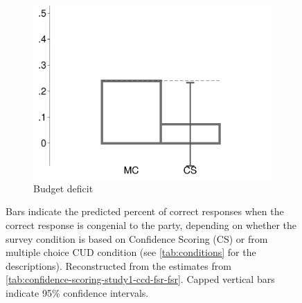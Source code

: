 \begin{figure}[t]
\begin{subfigure}{.325\textwidth}
		\includegraphics[width=\textwidth]{../figs/confidence_score_ccd_imc_14k_deficit_study1.pdf}
		\caption{Budget deficit}
	\end{subfigure}	
	\caption*{\footnotesize 
		Bars indicate the predicted percent of correct responses when the correct response is congenial to the party, depending on whether the survey condition is based on Confidence Scoring (CS) or from multiple choice CUD condition (see \cref{tab:conditions} for the descriptions).
		Reconstructed from the estimates from \cref{tab:confidence-scoring-study1-ccd-fsr-fsr}.
		Capped vertical bars indicate 95\% confidence intervals.
	}
	\label{fig:confidence-scoring-study1-ccd-imc-14k}
\end{figure}

